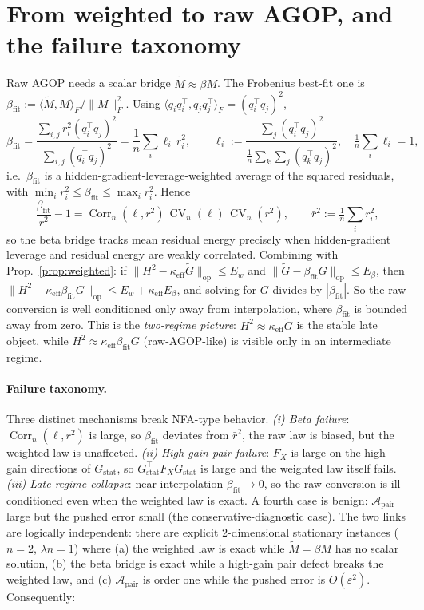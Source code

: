 \documentclass[10pt]{article}
\newcommand{\T}{^{\!\top}}
\newcommand{\op}{\mathrm{op}}
\newcommand{\eff}{\mathrm{eff}}
\newcommand{\pair}{\mathrm{pair}}
\newcommand{\stat}{\mathrm{stat}}
\newcommand{\Gw}{\widetilde{G}}
\newcommand{\Mw}{\widetilde{M}}
\newcommand{\fit}{\mathrm{fit}}
\DeclareMathOperator{\Corr}{Corr}
\DeclareMathOperator{\CV}{CV}
\begin{document}
\section{From weighted to raw AGOP, and the failure taxonomy}

Raw AGOP needs a scalar bridge $\Mw \approx \beta M$. The Frobenius best-fit one is $\beta_{\fit} := \langle \Mw, M\rangle_F / \|M\|_F^2$. Using $\langle q_iq_i\T, q_jq_j\T\rangle_F = (q_i\T q_j)^2$,
\[
\beta_{\fit} = \frac{\sum_{i,j} r_i^2 (q_i\T q_j)^2}{\sum_{i,j}(q_i\T q_j)^2} = \frac{1}{n}\sum_i \ell_i\, r_i^2, \qquad \ell_i := \frac{\sum_j (q_i\T q_j)^2}{\tfrac1n\sum_k\sum_j(q_k\T q_j)^2}, \quad \tfrac1n\sum_i \ell_i = 1,
\]
i.e.\ $\beta_{\fit}$ is a hidden-gradient-leverage-weighted average of the squared residuals, with $\min_i r_i^2 \le \beta_{\fit} \le \max_i r_i^2$. Hence
\[
\frac{\beta_{\fit}}{\bar r^2} - 1 = \Corr_n(\ell, r^2)\,\CV_n(\ell)\,\CV_n(r^2), \qquad \bar r^2 := \tfrac1n\sum_i r_i^2,
\]
so the beta bridge tracks mean residual energy precisely when hidden-gradient leverage and residual energy are weakly correlated. Combining with Prop.~\ref{prop:weighted}: if $\|H^2 - \kappa_{\eff}\Gw\|_\op \le E_w$ and $\|\Gw - \beta_{\fit}G\|_\op \le E_\beta$, then $\|H^2 - \kappa_{\eff}\beta_{\fit}G\|_\op \le E_w + \kappa_{\eff}E_\beta$, and solving for $G$ divides by $|\beta_{\fit}|$. So the raw conversion is well conditioned only away from interpolation, where $\beta_{\fit}$ is bounded away from zero. This is the \emph{two-regime picture}: $H^2 \approx \kappa_{\eff}\Gw$ is the stable late object, while $H^2 \approx \kappa_{\eff}\beta_{\fit}G$ (raw-AGOP-like) is visible only in an intermediate regime.

\paragraph{Failure taxonomy.} Three distinct mechanisms break NFA-type behavior. \emph{(i) Beta failure}: $\Corr_n(\ell,r^2)$ is large, so $\beta_{\fit}$ deviates from $\bar r^2$, the raw law is biased, but the weighted law is unaffected. \emph{(ii) High-gain pair failure}: $F_X$ is large on the high-gain directions of $G_{\stat}$, so $G_{\stat}\T F_X G_{\stat}$ is large and the weighted law itself fails. \emph{(iii) Late-regime collapse}: near interpolation $\beta_{\fit}\to 0$, so the raw conversion is ill-conditioned even when the weighted law is exact. A fourth case is benign: $\mathcal A_{\pair}$ large but the pushed error small (the conservative-diagnostic case). The two links are logically independent: there are explicit $2$-dimensional stationary instances ($n=2$, $\lambda n = 1$) where (a) the weighted law is exact while $\Mw = \beta M$ has no scalar solution, (b) the beta bridge is exact while a high-gain pair defect breaks the weighted law, and (c) $\mathcal A_{\pair}$ is order one while the pushed error is $O(\varepsilon^2)$. Consequently:
\end{document}
